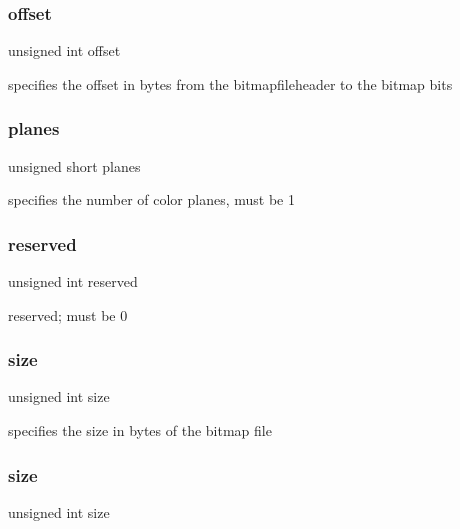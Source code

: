 \subsubsection{\texorpdfstring{offset}{offset}}
{\footnotesize\ttfamily unsigned int offset}



specifies the offset in bytes from the bitmapfileheader to the bitmap bits 

\hypertarget{group___bitmap_ga8c89d091e05544a82dc2398eed99634f}{}\label{group___bitmap_ga8c89d091e05544a82dc2398eed99634f} 
\subsubsection{\texorpdfstring{planes}{planes}}
{\footnotesize\ttfamily unsigned short planes}



specifies the number of color planes, must be 1 

\hypertarget{group___bitmap_ga05d5cbcb44f437341bd9fa37d589aced}{}\label{group___bitmap_ga05d5cbcb44f437341bd9fa37d589aced} 
\subsubsection{\texorpdfstring{reserved}{reserved}}
{\footnotesize\ttfamily unsigned int reserved}



reserved; must be 0 

\hypertarget{group___bitmap_gaac913b3a1f6ef005d66bf7a84428773e}{}\label{group___bitmap_gaac913b3a1f6ef005d66bf7a84428773e} 
\subsubsection{\texorpdfstring{size}{size}\hspace{0.1cm}{\footnotesize\ttfamily [1/2]}}
{\footnotesize\ttfamily unsigned int size}



specifies the size in bytes of the bitmap file 

\hypertarget{group___bitmap_gaac913b3a1f6ef005d66bf7a84428773e}{}\label{group___bitmap_gaac913b3a1f6ef005d66bf7a84428773e} 
\subsubsection{\texorpdfstring{size}{size}\hspace{0.1cm}{\footnotesize\ttfamily [2/2]}}
{\footnotesize\ttfamily unsigned int size}



